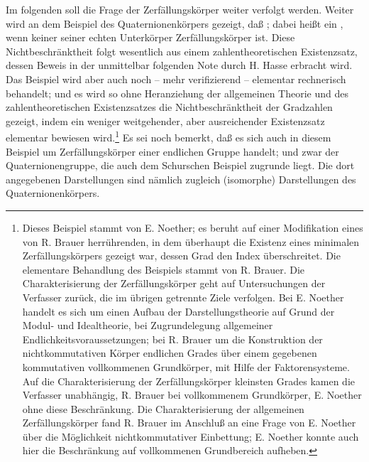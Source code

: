 Im folgenden soll die Frage der Zerfällungskörper weiter verfolgt werden.  Weiter wird an dem Beispiel des Quaternionenkörpers gezeigt, daß ; dabei heißt ein , wenn keiner seiner echten Unterkörper Zerfällungskörper ist. Diese Nichtbeschränktheit folgt wesentlich aus einem zahlentheoretischen Existenzsatz, dessen Beweis in der unmittelbar folgenden Note durch H. Hasse erbracht wird. Das Beispiel wird aber auch noch -- mehr verifizierend -- elementar rechnerisch behandelt; und es wird so ohne Heranziehung der allgemeinen Theorie und des zahlentheoretischen Existenzsatzes die Nichtbeschränktheit der Gradzahlen gezeigt, indem ein weniger weitgehender, aber ausreichender Existenzsatz elementar bewiesen wird.\footnote{Dieses Beispiel stammt von E. Noether; es beruht auf einer Modifikation eines von R. Brauer herrührenden, in dem überhaupt die Existenz eines minimalen Zerfällungskörpers gezeigt war, dessen Grad den Index überschreitet. Die elementare Behandlung des Beispiels stammt von R. Brauer. Die Charakterisierung der Zerfällungskörper geht auf Untersuchungen der Verfasser zurück, die im übrigen getrennte Ziele verfolgen. Bei E. Noether handelt es sich um einen Aufbau der Darstellungstheorie auf Grund der Modul- und Idealtheorie, bei Zugrundelegung allgemeiner Endlichkeitsvoraussetzungen; bei R. Brauer um die Konstruktion der nichtkommutativen Körper endlichen Grades über einem gegebenen kommutativen vollkommenen Grundkörper, mit Hilfe der Faktorensysteme. Auf die Charakterisierung der Zerfällungskörper kleinsten Grades kamen die Verfasser unabhängig, R. Brauer bei vollkommenem Grundkörper, E. Noether ohne diese Beschränkung. Die Charakterisierung der allgemeinen Zerfällungskörper fand R. Brauer im Anschluß an eine Frage von E. Noether über die Möglichkeit nichtkommutativer Einbettung; E. Noether konnte auch hier die Beschränkung auf vollkommenen Grundbereich aufheben.} Es sei noch bemerkt, daß es sich auch in diesem Beispiel um Zerfällungskörper einer endlichen Gruppe handelt; und zwar der Quaternionengruppe, die auch dem Schurschen Beispiel zugrunde liegt. Die dort angegebenen Darstellungen sind nämlich zugleich (isomorphe) Darstellungen des Quaternionenkörpers.
